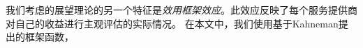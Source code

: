 
我们考虑的展望理论的另一个特征是\emph{效用框架效应}。此效应反映了每个服务提供商对自己的收益进行主观评估的实际情况。
在本文中，我们使用基于Kahneman提出的框架函数\cite{Kahneman}，
